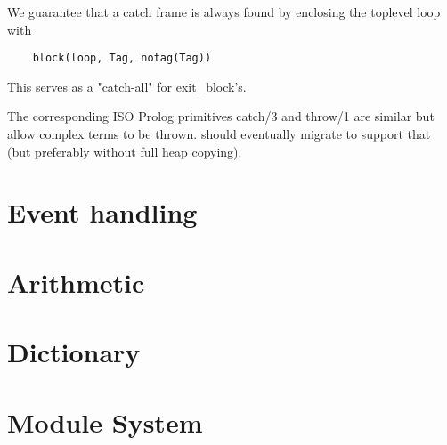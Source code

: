 We guarantee that a catch frame is always found by enclosing
the toplevel loop with
\begin{verbatim}
    block(loop, Tag, notag(Tag))
\end{verbatim}
This serves as a "catch-all" for exit_block's.

The corresponding ISO Prolog primitives catch/3 and throw/1 are similar
but allow complex terms to be thrown. {\eclipse} should eventually migrate
to support that (but preferably without full heap copying).


\section{Event handling}
\section{Arithmetic}
\section{Dictionary}
\section{Module System}

